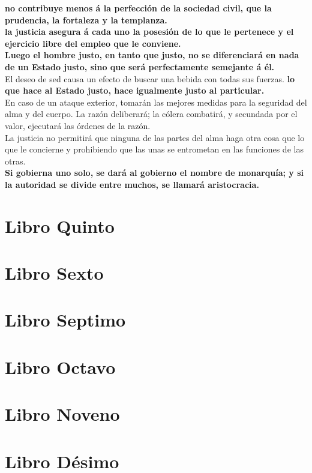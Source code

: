 \documentclass[10pt]{book}
\begin{document}
\textbf{no contribuye menos á la perfección de la sociedad civil, que la prudencia, la fortaleza y la templanza.}\\
\textbf{la justicia asegura á cada uno la posesión de lo que le pertenece y el ejercicio libre del  empleo que le conviene. }\\
\textbf{Luego el hombre justo, en tanto que justo, no se diferenciará en nada de un Estado justo, sino que será perfectamente semejante á él.}\\
El deseo de sed causa un efecto de buscar una bebida con todas sus fuerzas.
\textbf{lo que hace al Estado justo, hace igualmente justo al particular. } \\
En caso de un ataque exterior, tomarán las mejores medidas para la seguridad del alma y del cuerpo. La razón deliberará; la cólera combatirá, y secundada por el valor, ejecutará las órdenes de la razón. \\
La justicia no permitirá que ninguna de las partes del alma haga otra cosa que lo que le concierne y prohibiendo que las unas se entrometan en las funciones de las otras.\\
\textbf{ Si gobierna uno solo, se dará al gobierno el nombre de monarquía; y si la autoridad se divide entre muchos, se llamará aristocracia. }


\chapter*{Libro Quinto}

\chapter*{Libro Sexto}

\chapter*{Libro Septimo}

\chapter*{Libro Octavo}

\chapter*{Libro Noveno}

\chapter*{Libro Désimo}
 
\end{document}
